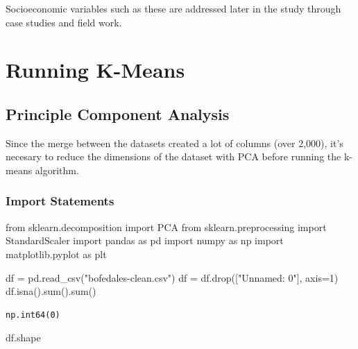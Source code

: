 \documentclass[
  letterpaper,
  DIV=11,
  numbers=noendperiod]{scrreprt}
\newenvironment{Shaded}{\begin{snugshade}}{\end{snugshade}}
\newcommand{\BuiltInTok}[1]{\textcolor[rgb]{0.00,0.23,0.31}{#1}}
\newcommand{\DecValTok}[1]{\textcolor[rgb]{0.68,0.00,0.00}{#1}}
\newcommand{\ImportTok}[1]{\textcolor[rgb]{0.00,0.46,0.62}{#1}}
\newcommand{\NormalTok}[1]{\textcolor[rgb]{0.00,0.23,0.31}{#1}}
\newcommand{\OperatorTok}[1]{\textcolor[rgb]{0.37,0.37,0.37}{#1}}
\newcommand{\StringTok}[1]{\textcolor[rgb]{0.13,0.47,0.30}{#1}}
\begin{document}
Socioeconomic variables such as these are addressed later in the study
through case studies and field work.

\part{Running K-Means}

\chapter{Principle Component
Analysis}\label{principle-component-analysis}

Since the merge between the datasets created a lot of columns (over
2,000), it's necesary to reduce the dimensions of the dataset with PCA
before running the k-means algorithm.

\section{Import Statements}\label{import-statements}

\begin{Shaded}
\begin{Highlighting}[]
\ImportTok{from}\NormalTok{ sklearn.decomposition }\ImportTok{import}\NormalTok{ PCA}
\ImportTok{from}\NormalTok{ sklearn.preprocessing }\ImportTok{import}\NormalTok{ StandardScaler}
\ImportTok{import}\NormalTok{ pandas }\ImportTok{as}\NormalTok{ pd}
\ImportTok{import}\NormalTok{ numpy }\ImportTok{as}\NormalTok{ np}
\ImportTok{import}\NormalTok{ matplotlib.pyplot }\ImportTok{as}\NormalTok{ plt}
\end{Highlighting}
\end{Shaded}

\begin{Shaded}
\begin{Highlighting}[]
\NormalTok{df }\OperatorTok{=}\NormalTok{ pd.read\_csv(}\StringTok{"bofedales{-}clean.csv"}\NormalTok{)}
\NormalTok{df }\OperatorTok{=}\NormalTok{ df.drop([}\StringTok{"Unnamed: 0"}\NormalTok{], axis}\OperatorTok{=}\DecValTok{1}\NormalTok{)}
\NormalTok{df.isna().}\BuiltInTok{sum}\NormalTok{().}\BuiltInTok{sum}\NormalTok{()}
\end{Highlighting}
\end{Shaded}

\begin{verbatim}
np.int64(0)
\end{verbatim}

\begin{Shaded}
\begin{Highlighting}[]
\NormalTok{df.shape}
\end{Highlighting}
\end{Shaded}
\end{document}
